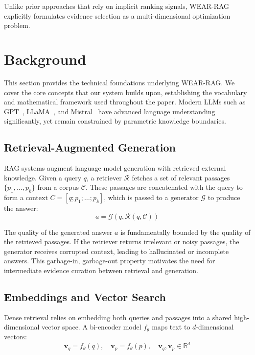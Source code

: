 \documentclass[conference]{IEEEtran}
\begin{document}
Unlike prior approaches that rely on implicit ranking signals, WEAR-RAG explicitly formulates evidence selection as a multi-dimensional optimization problem.

\section{Background}

This section provides the technical foundations underlying WEAR-RAG. We cover the core concepts that our system builds upon, establishing the vocabulary and mathematical framework used throughout the paper. Modern LLMs such as GPT~\cite{brown2020gpt3}, LLaMA~\cite{touvron2023llama}, and Mistral~\cite{jiang2023mistral} have advanced language understanding significantly, yet remain constrained by parametric knowledge boundaries.

\subsection{Retrieval-Augmented Generation}

RAG systems augment language model generation with retrieved external knowledge. Given a query $q$, a retriever $\mathcal{R}$ fetches a set of relevant passages $\{p_1, \ldots, p_k\}$ from a corpus $\mathcal{C}$. These passages are concatenated with the query to form a context $C = [q; p_1; \ldots; p_k]$, which is passed to a generator $\mathcal{G}$ to produce the answer:
\begin{equation}
a = \mathcal{G}(q, \mathcal{R}(q, \mathcal{C}))
\end{equation}

The quality of the generated answer $a$ is fundamentally bounded by the quality of the retrieved passages. If the retriever returns irrelevant or noisy passages, the generator receives corrupted context, leading to hallucinated or incomplete answers. This garbage-in, garbage-out property motivates the need for intermediate evidence curation between retrieval and generation.

\subsection{Embeddings and Vector Search}

Dense retrieval relies on embedding both queries and passages into a shared high-dimensional vector space. A bi-encoder model $f_\theta$ maps text to $d$-dimensional vectors:
\begin{equation}
\mathbf{v}_q = f_\theta(q), \quad \mathbf{v}_p = f_\theta(p), \quad \mathbf{v}_q, \mathbf{v}_p \in \mathbb{R}^d
\end{equation}
\end{document}
